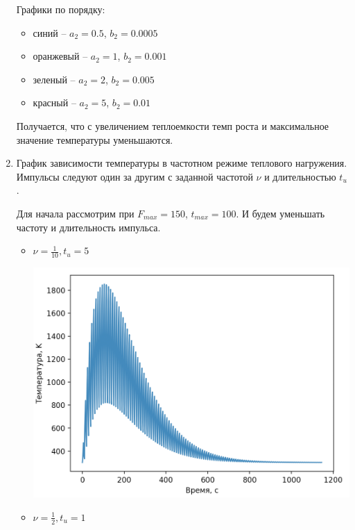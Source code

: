 \documentclass[a4paper,14pt]{extreport} %
\begin{document}
\begin{enumerate}
Графики по порядку:
\begin{itemize}
\item синий -- $a_2=0.5$, $b_2=0.0005$
\item оранжевый -- $a_2=1$, $b_2=0.001$
\item зеленый -- $a_2=2$, $b_2=0.005$
\item красный -- $a_2=5$, $b_2=0.01$
\end{itemize}

Получается, что с увеличением теплоемкости темп роста и максимальное значение температуры уменьшаются. 

\newpage

\item График зависимости температуры в частотном режиме теплового нагружения. Импульсы следуют один за другим с заданной частотой $\nu$ и длительностью $t_u$. 

Для начала рассмотрим при $F_{max}=150$, $t_{max}=100$. И будем уменьшать частоту и длительность импульса. 

\begin{itemize}

\item $\nu=\frac{1}{10}, t_u=5$

\includegraphics[scale=0.7]{8}

\newpage

\item $\nu=\frac{1}{2}, t_u=1$


\end{itemize}
\end{enumerate}
\end{document}
